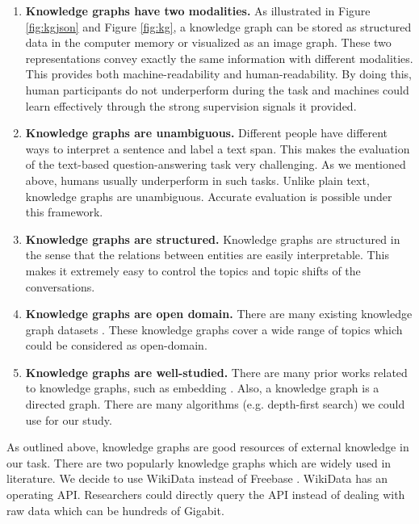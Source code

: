 \documentclass[bsc,frontabs,twoside,singlespacing,parskip,deptreport]{infthesis}     %
\begin{document}
\begin{enumerate}
   \item \textbf{Knowledge graphs have two modalities.} 
   As illustrated in Figure \ref{fig:kgjson} and Figure \ref{fig:kg}, a knowledge graph can be stored as structured data in the computer memory or visualized as an image graph. These two representations convey exactly the same information with different modalities. This provides both machine-readability and human-readability. By doing this, human participants do not underperform during the task and machines could learn effectively through the strong supervision signals it provided.
   
   \item \textbf{Knowledge graphs are unambiguous.} Different people have different ways to interpret a sentence and label a text span. This makes the evaluation of the text-based question-answering task very challenging. As we mentioned above, humans usually underperform in such tasks. Unlike plain text, knowledge graphs are unambiguous. Accurate evaluation is possible under this framework.
   
   \item  \textbf{Knowledge graphs are structured.} Knowledge graphs are structured in the sense that the relations between entities are easily interpretable. This makes it extremely easy to control the topics and topic shifts of the conversations.
   
    \item \textbf{Knowledge graphs are open domain.} There are many existing knowledge graph datasets \cite{vrandevcic2014wikidata,bollacker2008freebase}. These knowledge graphs cover a wide range of topics which could be considered as open-domain.
    
    \item \textbf{Knowledge graphs are well-studied.} There are many prior works related to knowledge graphs, such as embedding \cite{lin2015learning}. Also, a knowledge graph is a directed graph. There are many algorithms (e.g. depth-first search) we could use for our study.
    

\end{enumerate}


As outlined above, knowledge graphs are good resources of external knowledge in our task. There are two popularly knowledge graphs which are widely used in literature. We decide to use WikiData \cite{vrandevcic2014wikidata} instead of Freebase \cite{bollacker2008freebase}. WikiData has an operating API. Researchers could directly query the API instead of dealing with raw data which can be hundreds of Gigabit.
\end{document}

